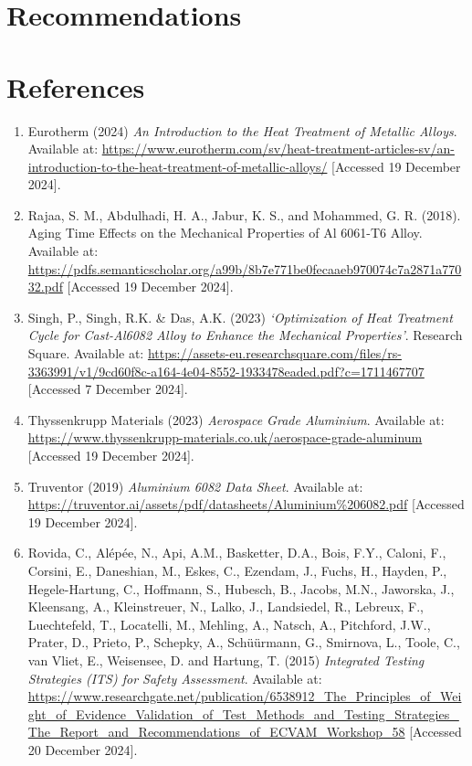 \documentclass{article}
\begin{document}
    \newpage\vspace*{-5pt}
    \section{Recommendations}

    \newpage\vspace*{-5pt}
    \section{References}
    \begin{enumerate}
        \item Eurotherm (2024) \textit{An Introduction to the Heat Treatment of Metallic Alloys}. Available at: \url{https://www.eurotherm.com/sv/heat-treatment-articles-sv/an-introduction-to-the-heat-treatment-of-metallic-alloys/} [Accessed 19 December 2024].
        
        \item Rajaa, S. M., Abdulhadi, H. A., Jabur, K. S., and Mohammed, G. R. (2018). Aging Time Effects on the Mechanical Properties of Al 6061-T6 Alloy. Available at: \url{https://pdfs.semanticscholar.org/a99b/8b7e771be0fecaaeb970074c7a2871a77032.pdf} [Accessed 19 December 2024].        

        \item Singh, P., Singh, R.K. \& Das, A.K. (2023) \textit{‘Optimization of Heat Treatment Cycle for Cast-Al6082 Alloy to Enhance the Mechanical Properties’}. Research Square. Available at: \url{https://assets-eu.researchsquare.com/files/rs-3363991/v1/9cd60f8c-a164-4e04-8552-1933478eaded.pdf?c=1711467707} [Accessed 7 December 2024].
        
        \item Thyssenkrupp Materials (2023) \textit{Aerospace Grade Aluminium}. Available at: \url{https://www.thyssenkrupp-materials.co.uk/aerospace-grade-aluminum} [Accessed 19 December 2024].
        
        \item Truventor (2019) \textit{Aluminium 6082 Data Sheet}. Available at: \url{https://truventor.ai/assets/pdf/datasheets/Aluminium%206082.pdf} [Accessed 19 December 2024].
        
        \item Rovida, C., Alépée, N., Api, A.M., Basketter, D.A., Bois, F.Y., Caloni, F., Corsini, E., Daneshian, M., Eskes, C., Ezendam, J., Fuchs, H., Hayden, P., Hegele-Hartung, C., Hoffmann, S., Hubesch, B., Jacobs, M.N., Jaworska, J., Kleensang, A., Kleinstreuer, N., Lalko, J., Landsiedel, R., Lebreux, F., Luechtefeld, T., Locatelli, M., Mehling, A., Natsch, A., Pitchford, J.W., Prater, D., Prieto, P., Schepky, A., Schüürmann, G., Smirnova, L., Toole, C., van Vliet, E., Weisensee, D. and Hartung, T. (2015) \textit{Integrated Testing Strategies (ITS) for Safety Assessment}. Available at: \url{https://www.researchgate.net/publication/6538912_The_Principles_of_Weight_of_Evidence_Validation_of_Test_Methods_and_Testing_Strategies_The_Report_and_Recommendations_of_ECVAM_Workshop_58} [Accessed 20 December 2024].
        

\end{enumerate}
\end{document}
